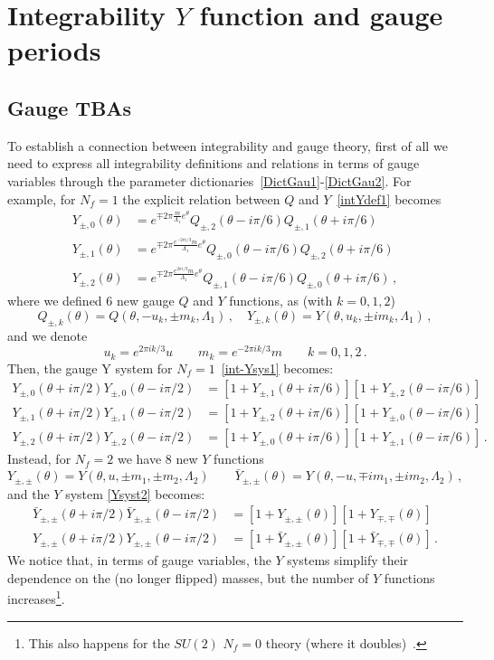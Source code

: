 \documentclass[11pt,a4paper]{elsarticle}
\def \th {\theta}
\def \ba {\begin{aligned}}
\def \ea {\end{aligned}}
\newcommand{\be}{\begin{equation}}
\newcommand{\ee}{\end{equation}}
\def\th{\theta}
\numberwithin{figure}{section}
\numberwithin{table}{section}
\begin{document}
\section{Integrability $Y$ function and gauge periods} \label{secY}

\subsection{Gauge TBAs}



To establish a connection between integrability and gauge theory, first of all we need to express all integrability definitions and relations in terms of gauge variables through the parameter dictionaries~\eqref{DictGau1}-\eqref{DictGau2}. For example, for $N_f=1$ the explicit relation between $Q$ and $Y$~\eqref{intYdef1} becomes
\begin{align} 
Y_{\pm,0}(\th)&= e^{\mp 2 \pi \frac{m}{\Lambda_1}e^\th}Q_{\pm,2}(\th-i\pi/6)Q_{\pm,1}(\th+i\pi/6)\\
Y_{\pm,1}(\th)&= e^{\mp 2 \pi \frac{e^{-2 \pi i/3}m}{\Lambda_1}e^\th}Q_{\pm,0}(\th-i\pi/6)Q_{\pm,2}(\th+i\pi/6)\\
Y_{\pm,2}(\th)&= e^{\mp 2 \pi \frac{e^{2 \pi i /3}m}{\Lambda_1}e^\th}Q_{\pm,1}(\th-i\pi/6)Q_{\pm,0}(\th+i\pi/6)\,,
\end{align}
where we defined $6$ new gauge $Q$ and $Y$ functions, as (with $k=0,1,2$)
\be  \label{QYk}
Q_{\pm,k}(\th)=Q(\th,-u_k, \pm m_k,\Lambda_1)\,, \quad Y_{\pm,k}(\th)=Y(\th,u_k,\pm i m_k,\Lambda_1)\,,
\ee 
and we denote
\be 
u_k = e^{2\pi i k/3} u \qquad m_k = e^{-2 \pi ik/3} m  \qquad k=0,1,2\,.
\ee 
Then, the gauge Y system for $N_f=1$~\eqref{int-Ysys1} becomes: 
\be \label{gauYsys1}
\ba 
Y_{\pm,0}(\theta+i\pi/2)Y_{\pm,0}(\theta-i\pi/2)&=\left[1+Y_{\pm,1}(\theta+i\pi/6)\right]\left[1+Y_{\pm,2}(\theta-i\pi/6)\right]\\
Y_{\pm,1}(\theta+i\pi/2)Y_{\pm,1}(\theta-i\pi/2)&=\left[1+Y_{\pm,2}(\theta+i\pi/6)\right]\left[1+Y_{\pm,0}(\theta-i\pi/6)\right]\\
Y_{\pm,2}(\theta+i\pi/2)Y_{\pm,2}(\theta-i\pi/2)&=\left[1+Y_{\pm,0}(\theta+i\pi/6)\right]\left[1+Y_{\pm,1}(\theta-i\pi/6)\right]\,.
\ea 
\ee
Instead, for $N_f=2$ we have $8$ new $Y$ functions
\be 
Y_{\pm,\pm} (\th) =Y(\th,u,\pm m_1,\pm m_2 ,\Lambda_2)\qquad \bar{Y}_{\pm,\pm} (\th) =Y(\th,-u,\mp i m_1,\pm i m_2 ,\Lambda_2)\,,
\ee
and the $Y$ system \eqref{Ysyst2} becomes:  
\be \label{gauYsys2}
\ba 
\bar{Y}_{\pm,\pm} (\th+i \pi/2)\bar{Y}_{\pm,\pm} (\th-i \pi/2)&=[1+Y_{\pm,\pm}(\th)][1+Y_{\mp,\mp}(\th)] \\
Y_{\pm,\pm} (\th+i \pi/2)Y_{\pm,\pm} (\th-i \pi/2)&=[1+\bar{Y}_{\pm,\pm}(\th)][1+\bar{Y}_{\mp,\mp}(\th)]\,.
\ea 
\ee
We notice that, in terms of gauge variables, the $Y$ systems simplify their dependence on the (no longer flipped) masses, but the number of $Y$ functions increases\footnote{This also happens for the $SU(2)$ $N_f=0$ theory (where it doubles)~\cite{FioravantiGregori:2019}.}. 
\end{document}
